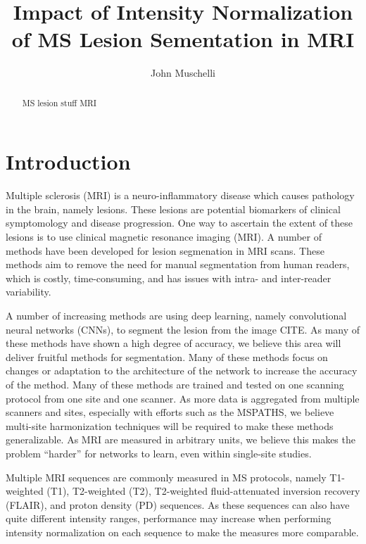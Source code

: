 \documentclass[]{elsarticle} %
\begin{document}
\begin{frontmatter}

  \title{Impact of Intensity Normalization of MS Lesion Sementation in MRI}
    \author[JHSPH]{John Muschelli}
      \address[JHSPH]{Johns Hopkins Bloomberg School of Public Health, Department of Biostatistics, 615 N Wolfe St, Baltimore, MD, 21205}
    
  \begin{abstract}
  MS lesion stuff MRI
  \end{abstract}
  
 \end{frontmatter}

\hypertarget{introduction}{%
\section{Introduction}\label{introduction}}

Multiple sclerosis (MRI) is a neuro-inflammatory disease which causes pathology in the brain, namely lesions. These lesions are potential biomarkers of clinical symptomology and disease progression. One way to ascertain the extent of these lesions is to use clinical magnetic resonance imaging (MRI). A number of methods have been developed for lesion segmenation in MRI scans. These methods aim to remove the need for manual segmentation from human readers, which is costly, time-consuming, and has issues with intra- and inter-reader variability.

A number of increasing methods are using deep learning, namely convolutional neural networks (CNNs), to segment the lesion from the image CITE. As many of these methods have shown a high degree of accuracy, we believe this area will deliver fruitful methods for segmentation. Many of these methods focus on changes or adaptation to the architecture of the network to increase the accuracy of the method. Many of these methods are trained and tested on one scanning protocol from one site and one scanner. As more data is aggregated from multiple scanners and sites, especially with efforts such as the MSPATHS, we believe multi-site harmonization techniques will be required to make these methods generalizable. As MRI are measured in arbitrary units, we believe this makes the problem ``harder'' for networks to learn, even within single-site studies.

Multiple MRI sequences are commonly measured in MS protocols, namely T1-weighted (T1), T2-weighted (T2), T2-weighted fluid-attenuated inversion recovery (FLAIR), and proton density (PD) sequences. As these sequences can also have quite different intensity ranges, performance may increase when performing intensity normalization on each sequence to make the measures more comparable.
\end{document}
